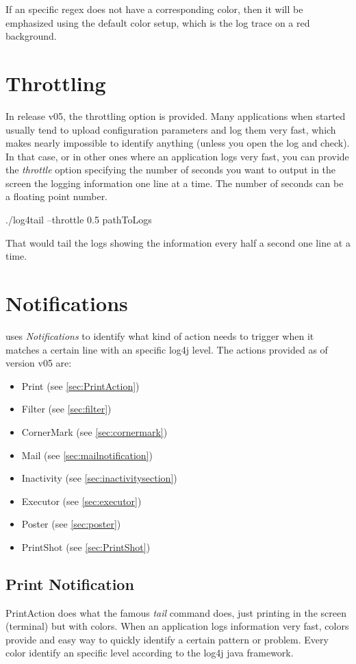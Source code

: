 If an specific regex does not have a corresponding color, then it will be
emphasized using the default color setup, which is the log trace on a red
background.

\section{Throttling}
In release v05, the throttling option is provided. Many applications when
started usually tend to upload configuration parameters and log them very fast,
which makes nearly impossible to identify anything (unless you open the log and
check). In that case, or in other ones where an application logs very fast, you
can provide the \emph{throttle} option specifying the number of seconds you want
to output in the screen the logging information one line at a time. The number 
of seconds can be a floating point number.
\begin{cmd}
 ./log4tail --throttle 0.5 pathToLogs
\end{cmd}
That would tail the logs showing the information every half a second one line at 
a time.


\section{Notifications}
\logftailer{} uses \emph{Notifications} to identify what kind of action needs to
trigger when it matches a certain line with an specific log4j level. The actions
provided as of version v05 are:
\begin{itemize}
 \item Print (see \autoref{sec:PrintAction})
 \item Filter (see \autoref{sec:filter})
 \item CornerMark (see \autoref{sec:cornermark})
 \item Mail (see \autoref{sec:mailnotification})
 \item Inactivity (see \autoref{sec:inactivitysection})
 \item Executor (see \autoref{sec:executor})
 \item Poster (see \autoref{sec:poster})
 \item PrintShot (see \autoref{sec:PrintShot})
\end{itemize}

\subsection{Print Notification}
\label{sec:PrintAction}
PrintAction does what the famous \emph{tail} command does, just printing in the
screen (terminal) but with colors. When an application logs information very
fast, colors provide and easy way to quickly identify a certain pattern or
problem. Every color identify an specific level according to the log4j java
framework.

